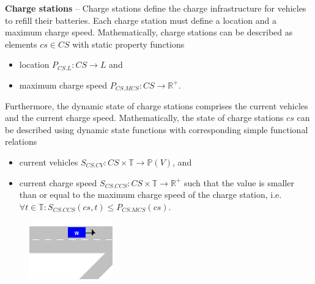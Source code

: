 \documentclass[graybox]{svmult}
\begin{document}
\noindent
\textbf{Charge stations}
--
Charge stations define the charge infrastructure for vehicles to refill their batteries.
Each charge station must define a location and a maximum charge speed.
Mathematically, charge stations can be described as elements $cs \in CS$ with static property functions
\begin{itemize}
	\item location $P_{CS.L}: CS \rightarrow L$ and
	\item maximum charge speed $P_{CS.MCS}: CS \rightarrow \mathbb{R}^+$.
\end{itemize}
Furthermore, the dynamic state of charge stations comprises the current vehicles and the current charge speed.
Mathematically, the state of charge stations $cs$ can be described using dynamic state functions with corresponding simple functional relations
\begin{itemize}
	\item current vehicles $S_{CS.CV}: CS \times \mathbb{T} \rightarrow \mathbb{P}(V)$, and
	\item current charge speed $S_{CS.CCS}: CS \times \mathbb{T} \rightarrow \mathbb{R}^+$ such that the value is smaller than or equal to the maximum charge speed of the charge station, i.e.\ $\forall t \in \mathbb{T}: S_{CS.CCS}(cs,t) \leq P_{CS.MCS}(cs)$.
\end{itemize}
\vspace{2mm}

\begin{figure}
	\centering
	\includegraphics[scale=0.7]{../../concepts/vehicle.png}
\end{figure}
\end{document}
